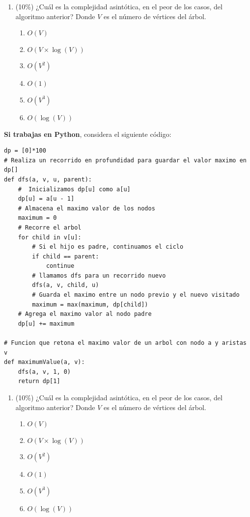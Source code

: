 \documentclass[10 pt]{article}
\begin{document}
  \begin{enumerate}[label=(\Alph*)]
    \item (10\%) ¿Cuál es la complejidad asintótica, en el peor de los casos, del algoritmo anterior? Donde $V$ es el número de vértices del árbol.
    \begin{enumerate}[label=\roman*)]
      \item $O(V)$
      \item $O(V \times \log(V))$
      \item $O(V^2)$
      \item $O(1)$
      \item $O(V^3)$
      \item $O(\log(V))$
    \end{enumerate}
  \end{enumerate}



\newpage

\textbf{Si trabajas en Python}, considera el siguiente código:

\begin{lstlisting}
dp = [0]*100
# Realiza un recorrido en profundidad para guardar el valor maximo en dp[]
def dfs(a, v, u, parent):  
    #  Inicializamos dp[u] como a[u]
    dp[u] = a[u - 1]
    # Almacena el maximo valor de los nodos
    maximum = 0   
    # Recorre el arbol
    for child in v[u]:    
        # Si el hijo es padre, continuamos el ciclo
        if child == parent:
            continue        
        # llamamos dfs para un recorrido nuevo
        dfs(a, v, child, u)       
        # Guarda el maximo entre un nodo previo y el nuevo visitado
        maximum = max(maximum, dp[child])        
    # Agrega el maximo valor al nodo padre
    dp[u] += maximum
 
# Funcion que retona el maximo valor de un arbol con nodo a y aristas v
def maximumValue(a, v):
    dfs(a, v, 1, 0)
    return dp[1]
\end{lstlisting}

  \begin{enumerate}[label=(\Alph*)]
    \item (10\%) ¿Cuál es la complejidad asintótica, en el peor de los casos, del algoritmo anterior? Donde $V$ es el número de vértices del árbol.
    \begin{enumerate}[label=\roman*)]
      \item $O(V)$
      \item $O(V \times \log(V))$
      \item $O(V^2)$
      \item $O(1)$
      \item $O(V^3)$
      \item $O(\log(V))$
    \end{enumerate}
  \end{enumerate}
\end{document}
